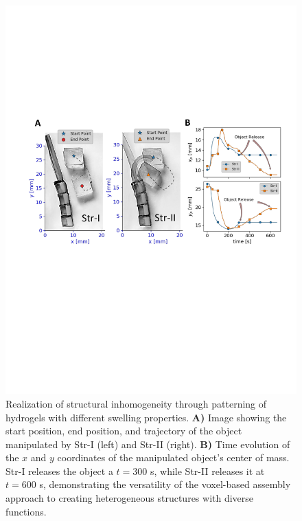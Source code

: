 \begin{figure}[!ht]
\centering
\includegraphics[width=\textwidth]{hardcodedtraj.pdf}
\caption[Trajectories created by hard-coded structures]{Realization of structural inhomogeneity through patterning of hydrogels with different swelling properties. \textbf{A)} Image showing the start position,  end position, and  trajectory of the  object manipulated by Str-I (left) and Str-II (right). \textbf{B)} Time evolution of the $x$ and $y$ coordinates of the manipulated object's center of mass.  Str-I releases the object   a $t=300$ s, while  Str-II releases it at $t= 600$ s, demonstrating the versatility of the voxel-based assembly approach to creating heterogeneous structures with diverse functions.}
\label{fig:hardcodedtraj}
\end{figure}

